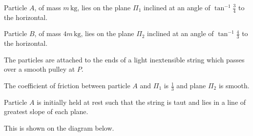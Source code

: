 \documentclass[
    style=OCRALevel,
    coverstyle=WellyOCR
]{examx}
\begin{document}
\begin{questions}
{
		}
		\solnpage
        \solnpage
		\examnewpage
		\question Particle $A$, of mass $m\,\unit{\kg}$, lies on the plane $\Pi_1$ inclined at an angle of $\tan^{-1}\frac{3}{4}$ to the horizontal.
		
		Particle $B$, of mass $4m\,\unit{\kg}$, lies on the plane $\Pi_2$ inclined at an angle of $\tan^{-1}\frac{4}{3}$ to the horizontal.
		 
		The particles are attached to the ends of a light inextensible string which passes over a smooth 
		pulley at $P$.
		 
		The coefficient of friction between particle $A$ and $\Pi_1$ is $\frac{1}{3}$ and plane $\Pi_2$ is smooth.
		
		Particle $A$ is initially held at rest such that the string is taut and lies in a line of greatest slope of each plane.
		
		\bigskip
		This is shown on the diagram below.
		
\end{questions}
\end{document}
